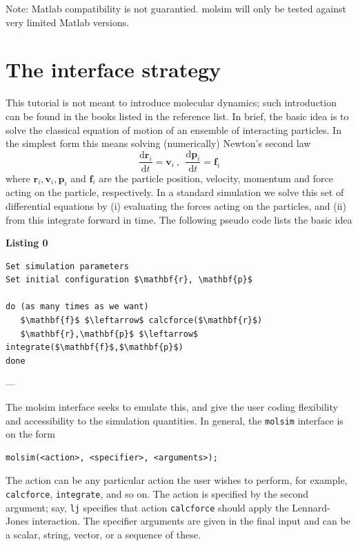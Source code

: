 \documentclass[11pt]{article}
\begin{document}
\bigskip

\noindent Note: Matlab compatibility is not guarantied. \textsf{molsim} will
only be tested against very limited Matlab versions.

\section{The interface strategy}
This tutorial is not meant to introduce molecular dynamics; such introduction
can be found in the books listed in the reference list. In brief, the basic idea
is to solve the classical equation of motion of an ensemble of interacting
particles. In the simplest form this means solving (numerically) Newton's second
law
\begin{equation}
  \frac{\mathrm{d}\mathbf{r}_i}{\mathrm{d} t} = \mathbf{v}_i \ , \ \
  \frac{\mathrm{d}\mathbf{p}_i}{\mathrm{d} t} = \mathbf{f}_i
\end{equation}
where $\mathbf{r}_i, \mathbf{v}_i, \mathbf{p}_i$ and $\mathbf{f}_i$ are the
particle position, velocity, momentum and force acting on the particle, respectively. In a
standard simulation we solve this set of differential equations by (i)
evaluating the forces acting on the particles, and (ii) from this integrate
forward in time. The following pseudo code lists the basic idea

\bigskip

\clearpage

\noindent \textbf{Listing 0}
\begin{lstlisting}
Set simulation parameters
Set initial configuration $\mathbf{r}, \mathbf{p}$

do (as many times as we want)
   $\mathbf{f}$ $\leftarrow$ calcforce($\mathbf{r}$)
   $\mathbf{r},\mathbf{p}$ $\leftarrow$ integrate($\mathbf{f}$,$\mathbf{p}$)
done
\end{lstlisting}
---

\noindent The \textsf{molsim} interface seeks to emulate this, and give the user
coding flexibility and accessibility to the simulation quantities. In general,
the \verb!molsim! interface is on the form
\begin{verbatim}
molsim(<action>, <specifier>, <arguments>);
\end{verbatim}
The action can be any particular action the user wishes to perform, for example,
\verb!calcforce!, \verb!integrate!, and so on. The action is specified by the
second argument; say, \verb!lj! specifies that action \verb!calcforce! should
apply the Lennard-Jones interaction. The specifier arguments are given in the
final input and can be a scalar, string, vector, or a sequence of these.
\end{document}
